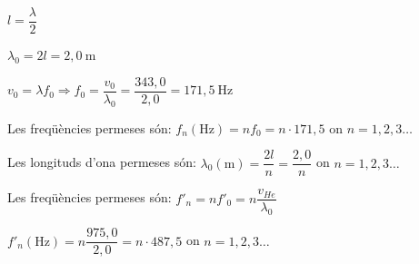 \begin{solapartat}
\begin{minipage}[t]{0.7\linewidth}
 $l = \dfrac{\lambda}{2}$

 $\lambda_0 = 2l = 2,0\ \mathrm{m}$
\end{minipage}\hfill
\begin{minipage}[t]{0.26\linewidth}
\vspace{0pt}
\end{minipage}

 $v_0 = \lambda f_0 \Rightarrow f_0 = \dfrac{v_0}{\lambda_0} = \dfrac{343,0}{2,0} = 171,5\ \mathrm{Hz}$

 Les freqüències permeses són: $f_n(\mathrm{Hz}) = nf_0 = n\cdot 171,5$ on $n = 1, 2, 3\ldots$

 Les longituds d'ona permeses són: $\lambda_0(\mathrm{m}) = \dfrac{2l}{n} = \dfrac{2,0}{n}$ on $n = 1, 2, 3\ldots$
\end{solapartat}

\begin{solapartat}
 Les freqüències permeses són: $f'_n = nf'_0 = n\dfrac{v_{He}}{\lambda_0}$

 $f'_n(\mathrm{Hz}) = n\dfrac{975,0}{2,0} = n\cdot 487,5$ on $n = 1, 2, 3\ldots$
\end{solapartat}
